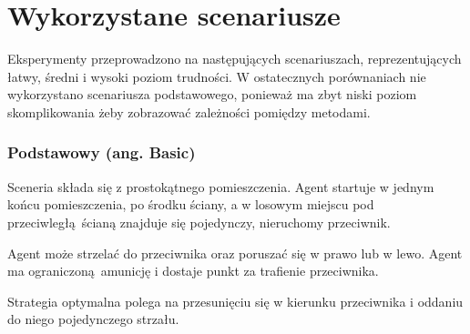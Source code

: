 \section{Wykorzystane scenariusze}
Eksperymenty przeprowadzono na następujących scenariuszach, reprezentujących łatwy, średni i wysoki poziom trudności. W ostatecznych porównaniach nie wykorzystano scenariusza podstawowego, ponieważ ma zbyt niski poziom skomplikowania żeby zobrazować zależności pomiędzy metodami.

\subsubsection{Podstawowy (ang. Basic)}\label{scenario_basic}
Sceneria składa się z prostokątnego pomieszczenia. Agent startuje w jednym końcu pomieszczenia, po środku ściany, a w losowym miejscu pod przeciwległą ścianą znajduje się pojedynczy, nieruchomy przeciwnik.

Agent może strzelać do przeciwnika oraz poruszać się w prawo lub w lewo. Agent ma ograniczoną amunicję i dostaje punkt za trafienie przeciwnika.

Strategia optymalna polega na przesunięciu się w kierunku przeciwnika i oddaniu do niego pojedynczego strzału.


\begin{figure}[H]
	\begin{floatrow}
	\end{floatrow}
\end{figure}

